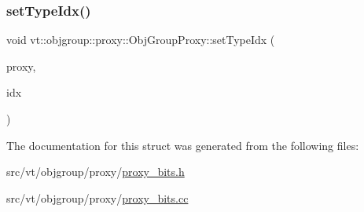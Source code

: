 \mbox{\label{structvt_1_1objgroup_1_1proxy_1_1_obj_group_proxy_abc524b044b063a643ede1ea3be501892}} 
\subsubsection{\texorpdfstring{set\+Type\+Idx()}{setTypeIdx()}}
{\footnotesize\ttfamily void vt\+::objgroup\+::proxy\+::\+Obj\+Group\+Proxy\+::set\+Type\+Idx (\begin{DoxyParamCaption}\item[{\hyperlink{namespacevt_ad7cae989df485fccca57f0792a880a8e}{Obj\+Group\+Proxy\+Type} \&}]{proxy,  }\item[{\hyperlink{namespacevt_1_1objgroup_a378e4b966221779c74f3a2f921eb2421}{Obj\+Type\+Idx\+Type}}]{idx }\end{DoxyParamCaption})\hspace{0.3cm}{\ttfamily [static]}}



The documentation for this struct was generated from the following files\+:\begin{DoxyCompactItemize}
\item 
src/vt/objgroup/proxy/\hyperlink{objgroup_2proxy_2proxy__bits_8h}{proxy\+\_\+bits.\+h}\item 
src/vt/objgroup/proxy/\hyperlink{objgroup_2proxy_2proxy__bits_8cc}{proxy\+\_\+bits.\+cc}\end{DoxyCompactItemize}
